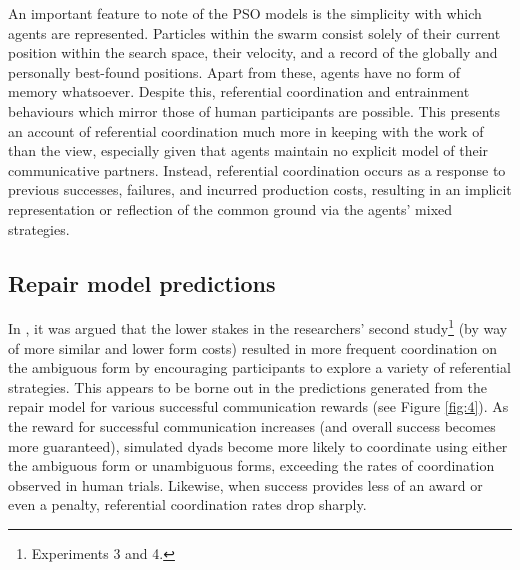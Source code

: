 \documentclass[12pt,a4paper]{article}
\begin{document}
An important feature to note of the PSO models is the simplicity with which agents are represented. Particles within the swarm consist solely of their current position within the search space, their velocity, and a record of the globally and personally best-found positions. Apart from these, agents have no form of memory whatsoever. Despite this, referential coordination and entrainment behaviours which mirror those of human participants are possible. This presents an account of referential coordination much more in keeping with the work of \citeauthor{horton1996} than the \citeauthor{clark1982} view, especially given that agents maintain no explicit model of their communicative partners. Instead, referential coordination occurs as a response to previous successes, failures, and incurred production costs, resulting in an implicit representation or reflection of the common ground via the agents' mixed strategies. 

\subsection{Repair model predictions}
In \citeauthor{rohde2012}, it was argued that the lower stakes in the researchers' second study\footnote{Experiments 3 and 4.} (by way of more similar and lower form costs) resulted in more frequent coordination on the ambiguous form by encouraging participants to explore a variety of referential strategies. This appears to be borne out in the predictions generated from the repair model for various successful communication rewards (see Figure \ref{fig:4}). As the reward for successful communication increases (and overall success becomes more guaranteed), simulated dyads become more likely to coordinate using either the ambiguous form or unambiguous forms, exceeding the rates of coordination observed in human trials. Likewise, when success provides less of an award or even a penalty, referential coordination rates drop sharply. 
\end{document}

